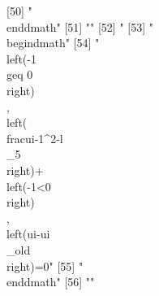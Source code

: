 [50] "\\end{dmath}"                                                                                                                                                                                                                                                                                  
[51] ""                                                                                                                                                                                                                                                                                              
[52] "%
[53] "\\begin{dmath}"                                                                                                                                                                                                                                                                                
[54] "\\left(-1\\geq 0\\right)\\, \\left(\\frac{{ui}}{-1^{2}}-{{l\\_5}}\\right)+\\left(-1<0\\right)\\, \\left({ui}-{{ui\\_old}}\\right)=0"                                                                                                                                                           
[55] "\\end{dmath}"                                                                                                                                                                                                                                                                                  
[56] ""                                                                                                                                                                                                                                                                                              
